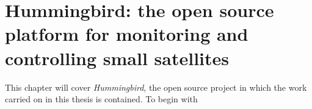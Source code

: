 
\chapter{Hummingbird: the open source platform for monitoring and controlling small satellites}\label{chapter3}

This chapter will cover \emph{Hummingbird}, the open source project in which the work carried on in this thesis is contained. To begin with 


\newpage
